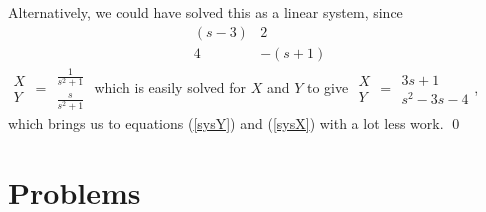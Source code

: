 \documentclass[12pt]{book}
\begin{document}
Alternatively, we could have solved this as a linear system, since
\bee
\[ \begin{array}{ll}
    (s-3) & 2\\
    4 & -(s+1)
  \end{array} \]
\( \begin{array}{l}
    X\\
    Y
  \end{array} \)
=
\( \begin{array}{l}
    \frac{1}{s^2+1}\\
    \frac{s}{s^2+1}
  \end{array} \)
\eee
which is easily solved for $X$ and $Y$ to give
\bee
\( \begin{array}{l}
    X\\
    Y
  \end{array} \)
=
 \cdot {}
\( \begin{array}{l}
    3s+1\\
    s^2 -3s -4
  \end{array} \),
\eee
which brings us to equations (\ref{sysY}) and (\ref{sysX}) with a lot less 
work. \qed

\section{Problems}
\end{document}
